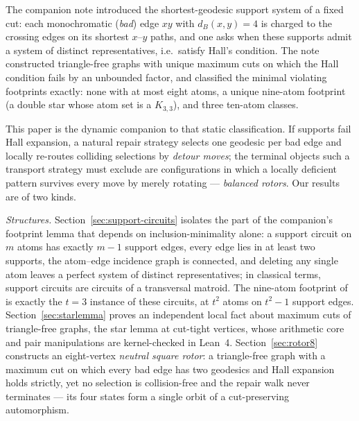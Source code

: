\documentclass[11pt]{article}
\theoremstyle{definition}
\begin{document}
The companion note \cite{Ferudun26supports} introduced the
shortest-geodesic support system of a fixed cut: each monochromatic
(\emph{bad}) edge \(xy\) with \(d_B(x,y)=4\) is charged to the crossing
edges on its shortest \(x\)--\(y\) paths, and one asks when these
supports admit a system of distinct representatives, i.e.\ satisfy
Hall's condition. The note constructed triangle-free graphs with unique
maximum cuts on which the Hall condition fails by an unbounded factor,
and classified the minimal violating footprints exactly: none with at
most eight atoms, a unique nine-atom footprint (a double star whose
atom set is a \(K_{3,3}\)), and three ten-atom classes.

This paper is the dynamic companion to that static classification. If
supports fail Hall expansion, a natural repair strategy selects one
geodesic per bad edge and locally re-routes colliding selections by
\emph{detour moves}; the terminal objects such a transport strategy
must exclude are configurations in which a locally deficient pattern
survives every move by merely rotating --- \emph{balanced rotors}. Our
results are of two kinds.

\emph{Structures.} Section~\ref{sec:support-circuits} isolates the
part of the companion's footprint lemma that depends on
inclusion-minimality alone: a support circuit on \(m\) atoms has
exactly \(m-1\) support edges, every edge lies in at least two
supports, the atom--edge incidence graph is connected, and deleting any
single atom leaves a perfect system of distinct representatives; in
classical terms, support circuits are circuits of a transversal
matroid. The nine-atom footprint of \cite{Ferudun26supports} is
exactly the \(t=3\) instance of these circuits, at \(t^2\) atoms on
\(t^2-1\) support edges. Section~\ref{sec:starlemma} proves an
independent local fact about maximum cuts of triangle-free graphs, the
star lemma at cut-tight vertices, whose arithmetic core and pair
manipulations are kernel-checked in Lean~4.
Section~\ref{sec:rotor8} constructs an eight-vertex \emph{neutral
square rotor}: a triangle-free graph with a maximum cut on which every
bad edge has two geodesics and Hall expansion holds strictly, yet no
selection is collision-free and the repair walk never terminates ---
its four states form a single orbit of a cut-preserving automorphism.
\end{document}
